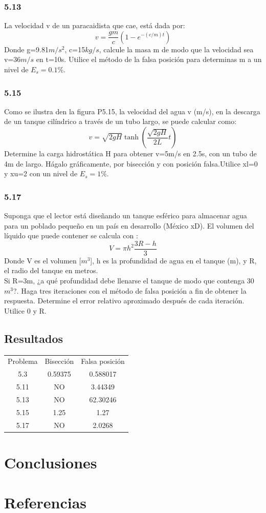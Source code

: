 \documentclass[12pt,oneside,FLEQN]{report}
\begin{document}
{		\subsection{5.13}
		La velocidad v de un paracaidista que cae, está dada por:
		\begin{equation}
			v=\dfrac{gm}{c}\left(1-e^{-(c/m)t}\right)
		\end{equation}
		Donde g=9.81$m/s^2$, c=15$kg/s$, calcule la masa m de modo que la velocidad sea v=36$m/s$ en t=10s. Utilice el método de la falsa posición para determinas m a un nivel de $E_{s}=0.1\%$.
			
		\subsection{5.15}
		Como se ilustra den la figura P5.15, la velocidad del agua v (m/s), en la descarga de un tanque cilíndrico a través de un tubo largo, se puede calcular como:
		\begin{equation}
			v=\sqrt{2gH}\tanh{\left(\dfrac{\sqrt{2gH}}{2L}t\right)}
		\end{equation}
		Determine la carga hidrostática H para obtener v=5m/s en 2.5s, con un tubo de 4m de largo. Hágalo gráficamente, por bisección y con posición falsa.Utilice xl=0 y xu=2 con un nivel de $E_{s}=1\%$.
			
		\subsection{5.17}
		Suponga que el lector está diseñando un tanque esférico para almacenar agua para un poblado pequeño en un país en desarrollo (México xD). El volumen del líquido que puede contener se calcula con :
		\begin{equation}
			V=\pi h^2\dfrac{3R-h}{3}
		\end{equation}
		Donde V es el volumen [$m^3$], h es la profundidad de agua en el tanque (m), y R, el radio del tanque en metros.\\

		Si R=3m, ¿a qué profundidad debe llenarse el tanque de modo que contenga 30$m^3$?. Haga tres iteraciones con el método de falsa posición a fin de obtener la respuesta. Determine el error relativo aproximado después de cada iteración. Utilice 0 y R.
			
	\section{Resultados}
	\begin{center}
		\begin{tabular}{|c|c|c|}
			\hline
			Problema&Bisección&Falsa posición\\
			5.3&0.59375&0.588017\\
			5.11&NO&3.44349\\
			5.13&NO&62.30246\\
			5.15&1.25&1.27\\
			5.17&NO&2.0268\\
			\hline
		\end{tabular}
	\end{center}
\chapter{Conclusiones}
\chapter{Referencias}
}
\end{document}
